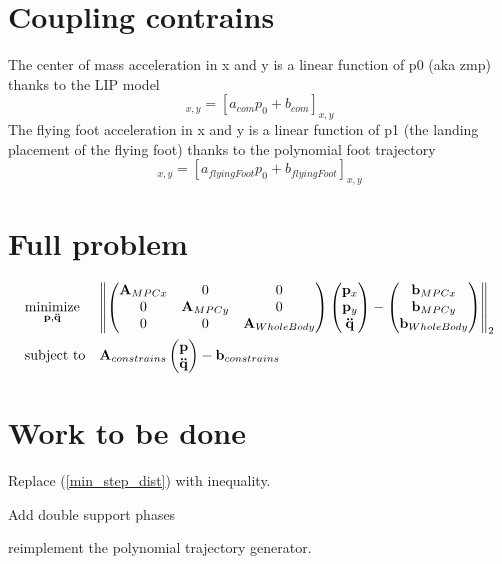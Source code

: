 \documentclass[10pt,a4paper]{article}
\begin{document}
\section*{Coupling contrains}
    The center of mass acceleration in x and y is a linear function of p0 (aka zmp) thanks to the LIP model
    \begin{equation}
        [{J}_{com} \ddot{q}+\dot{J}_{com} \dot{q}]_{x,y}=[a_{com}p_0+b_{com}]_{x,y}
    \end{equation}
    The flying foot acceleration in x and y is a linear function of p1 (the landing placement of the flying foot) thanks to the polynomial foot trajectory
    \begin{equation}
        [{J}_{flyingFoot} \ddot{q}+\dot{J}_{flyingFoot} \dot{q}]_{x,y}=[a_{flyingFoot}p_0+b_{flyingFoot}]_{x,y}
    \end{equation}
    \section*{Full problem}
    \begin{equation*}
    \begin{aligned}
    & \underset{\bold{p},\bold{\ddot{q}}}{\text{minimize}}
    & & \norm{
        \begin{pmatrix} 
             \bold{A}_{MPC x}     & 0 	 & 0\\
             0         & \bold{A}_{MPC y} & 0 \\
             0         & 0 &  \bold{A}_{WholeBody}
            \end{pmatrix}
        \begin{pmatrix} 
            \bold{p}_{x} \\
            \bold{p}_{y} \\
            \bold{\ddot{q}
            }
        \end{pmatrix}
        - \begin{pmatrix} 
            \bold{b}_{MPC x}\\
            \bold{b}_{MPC y}\\
            \bold{b}_{WholeBody}
        \end{pmatrix}	
    }_2 \\
    & \text{subject to}
    & & {\bold{A}_{constrains}\begin{pmatrix} 
            \bold{p} \\
            \bold{\ddot{q}}
        \end{pmatrix}- \bold{b}_{constrains}} 	
    \end{aligned}
    \end{equation*}

\section*{Work to be done}
Replace (\ref{min_step_dist}) with inequality.

Add double support phases

reimplement the polynomial trajectory generator.
\end{document}
